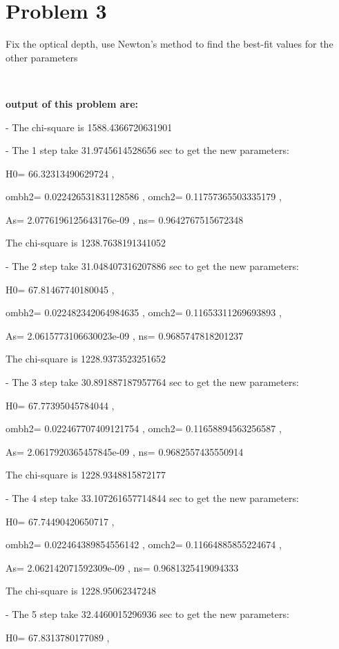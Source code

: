 \documentclass[showpacs, oneside, onecolumn, prl, amsmath, amssymb, nofootinbib, superscriptaddress, notitlepage]{revtex4-1}
\begin{document}
\section{Problem 3}

Fix the optical depth, use Newton's method to find the best-fit values for the other parameters

~~~~

\textbf{output of this problem are:}

- The chi-square is 1588.4366720631901

- The  1 step take  31.9745614528656 sec to get the new parameters:

H0= 66.32313490629724 ,

ombh2= 0.022426531831128586 , omch2= 0.11757365503335179 ,

As= 2.0776196125643176e-09 , ns= 0.9642767515672348

The chi-square is 1238.7638191341052


- The  2 step take  31.048407316207886 sec to get the new parameters:

H0= 67.81467740180045 ,

ombh2= 0.022482342064984635 , omch2= 0.11653311269693893 ,

As= 2.0615773106630023e-09 , ns= 0.9685747818201237

The chi-square is 1228.9373523251652


- The  3 step take  30.891887187957764 sec to get the new parameters:

H0= 67.77395045784044 ,

ombh2= 0.022467707409121754 , omch2= 0.11658894563256587 ,

As= 2.0617920365457845e-09 , ns= 0.9682557435550914

The chi-square is 1228.9348815872177


- The  4 step take  33.107261657714844 sec to get the new parameters:

H0= 67.74490420650717 ,

ombh2= 0.022464389854556142 , omch2= 0.11664885855224674 ,

As= 2.062142071592309e-09 , ns= 0.9681325419094333

The chi-square is 1228.95062347248


- The  5 step take  32.4460015296936 sec to get the new parameters:

H0= 67.8313780177089 ,
\end{document}
